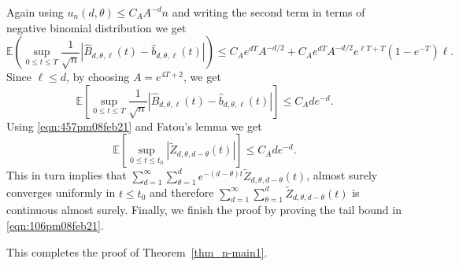 \documentclass[11pt]{article}
\begin{document}
Again using $u_n(d,\theta)\leq C_A A^{-d}n$ and writing the second term in terms of negative binomial distribution we get
\begin{equation*}
     \mathbb{E}\left(\sup_{0\leq t\leq T} \frac{1}{\sqrt{n}}  \left|\widehat{B}_{d,\theta,\ell}(t) - \widehat{b}_{d,\theta,\ell}(t)\right|\right) \leq C_A e^{dT}A^{-d/2}+ C_A e^{dT}A^{-d/2}e^{\ell T+T}(1-e^{-T})\ell.
\end{equation*}
Since $\ell\leq d$, by choosing $A=e^{4T+2}$, we get 
\begin{equation}\label{eqn:457pm08feb21}
    \mathbb{E}\left[\sup_{0\leq t\leq T} \frac{1}{\sqrt{n}} \left|\widehat{B}_{d,\theta,\ell}(t) - \widehat{b}_{d,\theta,\ell}(t)\right|\right] \leq C_A de^{-d}.
\end{equation}
Using \eqref{eqn:457pm08feb21} and Fatou's lemma we get
\begin{equation*}
    \mathbb{E}\left[\sup_{0\leq t\leq t_0}\left|\widetilde{Z}_{d,\theta,d-\theta}(t)\right|\right] \leq C_A de^{-d}.
\end{equation*}    
This in turn implies that $\sum_{d=1}^{\infty}\sum_{\theta=1}^{d} e^{-(d-\theta) t}\widetilde{Z}_{d,\theta,d-\theta}(t)$, almost surely converges uniformly in $t\leq t_0$ and therefore $\sum_{d=1}^{\infty}\sum_{\theta=1}^{d}\widetilde{Z}_{d,\theta,d-\theta}(t)$ is continuous almost surely. 
Finally, we finish the proof by proving the tail bound in \eqref{eqn:106pm08feb21}. 


This completes the proof of Theorem~\ref{thm_n-main1}.
\end{document}
